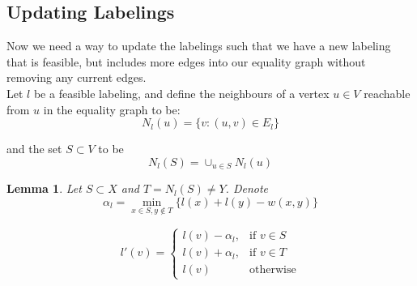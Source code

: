 \documentclass{article}
\newtheorem{lemma}[theorem]{Lemma}
\begin{document}
\subsection{Updating Labelings}

Now we need a way to update the labelings such that we have a new labeling that is feasible, but includes more edges into our equality graph without removing any current edges.\\

Let $l$ be a feasible labeling, and define the neighbours of a vertex $u \in V$ reachable from $u$ in the equality graph to be:
\begin{equation*}
N_l(u) = \{v : (u, v) \in E_l\}
\end{equation*}

and the set $S \subset V$ to be 
\begin{equation*}
N_l(S) = \cup_{u \in S} N_l(u)
\end{equation*}

\begin{lemma}
Let $S \subset X$ and $T = N_l(S) \neq Y$. Denote
\begin{equation*}
\alpha_l = \min_{x \in S, y\notin T} \{ l(x) + l(y) - w(x, y) \}
\end{equation*}

\[
    l'(v)= 
\begin{cases}
    l(v) - \alpha_l,& \text{if } v \in S\\
    l(v) + \alpha_l,& \text{if } v \in T\\
    l(v)              & \text{otherwise}
\end{cases}
\]
\end{lemma}
\end{document}
